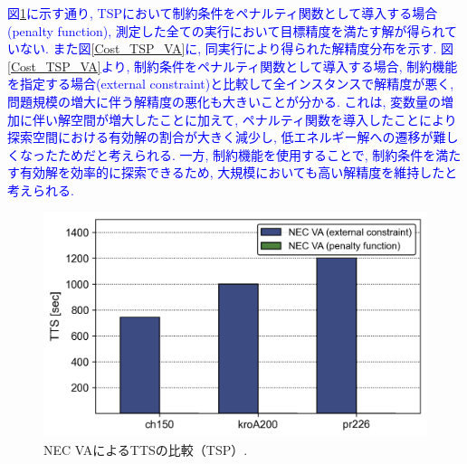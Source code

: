 \documentclass[submit,techrep,noauthor]{ipsj}
\begin{document}
\textcolor{blue}{図\ref{TTS_TSP_VA}に示す通り, TSPにおいて制約条件をペナルティ関数として導入する場合(penalty function), 測定した全ての実行において目標精度を満たす解が得られていない. また図\ref{Cost_TSP_VA}に, 同実行により得られた解精度分布を示す. 図\ref{Cost_TSP_VA}より, 制約条件をペナルティ関数として導入する場合, 制約機能を指定する場合(external constraint)と比較して全インスタンスで解精度が悪く, 問題規模の増大に伴う解精度の悪化も大きいことが分かる. これは, 変数量の増加に伴い解空間が増大したことに加えて, ペナルティ関数を導入したことにより探索空間における有効解の割合が大きく減少し, 低エネルギー解への遷移が難しくなったためだと考えられる. 一方, 制約機能を使用することで, 制約条件を満たす有効解を効率的に探索できるため, 大規模においても高い解精度を維持したと考えられる.}



\begin{figure}[th]
\centering
\includegraphics[bb=0 0 700 230, width=15cm]{TTS_TSP_VA.png}
\caption{NEC VAによるTTSの比較（TSP）.}
\label{TTS_TSP_VA}
\end{figure}
\end{document}
